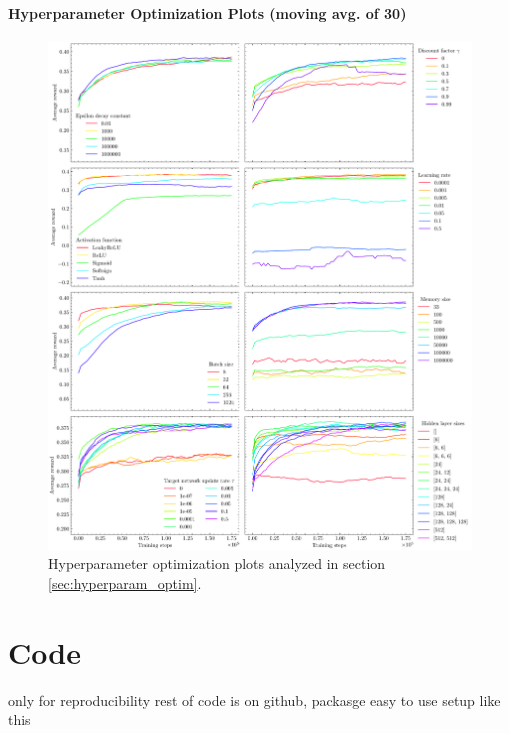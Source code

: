 \subsubsection{Hyperparameter Optimization Plots (moving avg. of 30)}
\label{app:hyperparam_optim_30}
\begin{figure}[H]
    \advance\leftskip-2.3cm
    \includegraphics[width=1.28\textwidth]{hyperparam_optim_30_sci.pdf}
    \caption{Hyperparameter optimization plots analyzed in section \ref{sec:hyperparam_optim}.}
    \label{fig:hyperparam_optim_30}
\end{figure}


\chapter{Code}
\label{app:code}
only for reproducibility
rest of code is on github, packasge easy to use
setup like this
